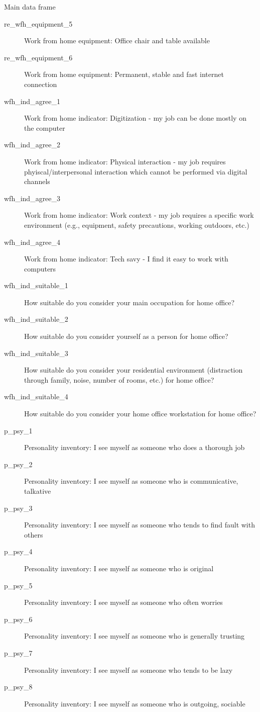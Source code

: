 \begin{Section}{Main data frame}
\begin{description}
\item[re\_wfh\_equipment\_5] Work from home equipment: Office chair and table available
\item[re\_wfh\_equipment\_6] Work from home equipment: Permanent, stable and fast internet connection
\item[wfh\_ind\_agree\_1] Work from home indicator: Digitization - my job can be done mostly on the computer
\item[wfh\_ind\_agree\_2] Work from home indicator: Physical interaction - my job requires phyiscal/interpersonal interaction which cannot be performed via digital channels
\item[wfh\_ind\_agree\_3] Work from home indicator: Work context - my job requires a specific work environment (e.g., equipment, safety precautions, working outdoors, etc.)
\item[wfh\_ind\_agree\_4] Work from home indicator: Tech savy - I find it easy to work with computers
\item[wfh\_ind\_suitable\_1] How suitable do you consider your main occupation for home office?
\item[wfh\_ind\_suitable\_2] How suitable do you consider yourself as a person for home office?
\item[wfh\_ind\_suitable\_3] How suitable do you consider your residential environment (distraction through family, noise, number of rooms, etc.) for home office?
\item[wfh\_ind\_suitable\_4] How suitable do you consider your home office workstation for home office?
\item[p\_psy\_1] Personality inventory: I see myself as someone who does a thorough job
\item[p\_psy\_2] Personality inventory: I see myself as someone who is communicative, talkative
\item[p\_psy\_3] Personality inventory: I see myself as someone who tends to find fault with others
\item[p\_psy\_4] Personality inventory: I see myself as someone who is original
\item[p\_psy\_5] Personality inventory: I see myself as someone who often worries
\item[p\_psy\_6] Personality inventory: I see myself as someone who is generally trusting
\item[p\_psy\_7] Personality inventory: I see myself as someone who tends to be lazy
\item[p\_psy\_8] Personality inventory: I see myself as someone who is outgoing, sociable

\end{description}
\end{Section}
